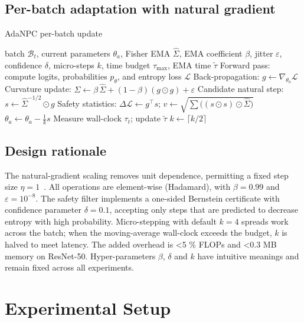 \documentclass{article} %
\begin{document}
\subsection{Per-batch adaptation with natural gradient}
\begin{algorithm}[t]
\caption{AdaNPC per-batch update}
\begin{algorithmic}[1]
\Require batch \(\mathcal{B}_t\), current parameters \(\theta_a\), Fisher EMA \(\hat{\Sigma}\), EMA coefficient \(\beta\), jitter \(\varepsilon\), confidence \(\delta\), micro-steps \(k\), time budget \(\tau_{\max}\), EMA time \(\tilde{\tau}\)%
\State Forward pass: compute logits, probabilities \(p_{\theta}\), and entropy loss \(\mathcal{L}\)%
\State Back-propagation: \(g \leftarrow \nabla_{\theta_a} \mathcal{L}\)%
\State Curvature update: \(\hat{\Sigma} \leftarrow \beta\,\hat{\Sigma} + (1-\beta) (g \odot g) + \varepsilon\)%
\State Candidate natural step: \(s \leftarrow \hat{\Sigma}^{-1/2} \odot g\)%
\State Safety statistics: \(\Delta \mathcal{L} \leftarrow g^{\top} s\); \(v \leftarrow \sqrt{\sum \big( (s \odot s) \odot \hat{\Sigma} \big)}\)%
    \State \(\theta_a \leftarrow \theta_a - \tfrac{1}{k} s\)%
  \EndFor%
\EndIf%
\State Measure wall-clock \(\tau_t\); update \(\tilde{\tau}\)%
  \State \(k \leftarrow \lceil k/2 \rceil\)%
\EndIf%
\end{algorithmic}
\end{algorithm}
\subsection{Design rationale}
The natural-gradient scaling removes unit dependence, permitting a fixed step size \(\eta = 1\)~\cite{aitchison-2018-bayesian}. All operations are element-wise (Hadamard), with \(\beta = 0.99\) and \(\varepsilon = 10^{-8}\). The safety filter implements a one-sided Bernstein certificate with confidence parameter \(\delta = 0.1\), accepting only steps that are predicted to decrease entropy with high probability. Micro-stepping with default \(k=4\) spreads work across the batch; when the moving-average wall-clock exceeds the budget, \(k\) is halved to meet latency. The added overhead is <5 \% FLOPs and <0.3 MB memory on ResNet-50. Hyper-parameters \(\beta\), \(\delta\) and \(k\) have intuitive meanings and remain fixed across all experiments.

\section{Experimental Setup}\label{sec:experimental}
\end{document}
